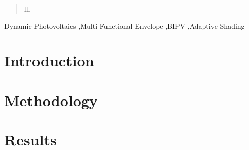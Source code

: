 \documentclass[preprint,11pt,3p]{elsarticle} %
\begin{document}
\begin{frontmatter}
\author[ita]{P. Jayathissa}
\address[ita]{Architecture and Building Systems, Institute of Technology in Architecture, Department of Architecture, ETH Zurich, Switzerland} 

\author[ita]{J. Zarb}


\author[ita]{M. Luzzatto}

\author[ita]{J. Hofer}



\author[ita]{A. Schlueter  }




\begin{abstract}

lll

\end{abstract}

\begin{keyword}
Dynamic Photovoltaics \sep Multi Functional Envelope \sep BIPV \sep Adaptive Shading
\end{keyword}

\end{frontmatter}

\section{Introduction}
\label{ch:introduction}


\section{Methodology}
\label{ch:method}


\section{Results}
\label{ch:results}



% 
\end{document}
